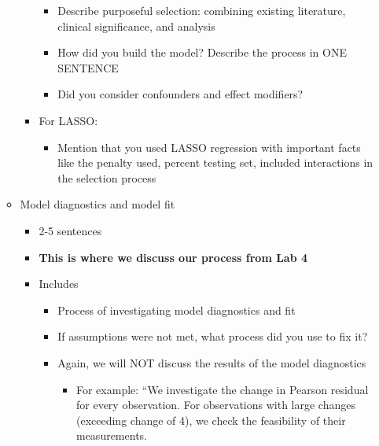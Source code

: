\documentclass[
  letterpaper,
  DIV=11,
  numbers=noendperiod]{scrartcl}
\providecommand{\tightlist}{%
  \setlength{\itemsep}{0pt}\setlength{\parskip}{0pt}}\usepackage{longtable,booktabs,array}
\begin{document}
\begin{itemize}
\begin{itemize}
\begin{itemize}
      \begin{itemize}
      \tightlist
      \item
        Describe purposeful selection: combining existing literature,
        clinical significance, and analysis
      \item
        How did you build the model? Describe the process in ONE
        SENTENCE
      \item
        Did you consider confounders and effect modifiers?
      \end{itemize}
    \item
      For LASSO:

      \begin{itemize}
      \tightlist
      \item
        Mention that you used LASSO regression with important facts like
        the penalty used, percent testing set, included interactions in
        the selection process
      \end{itemize}
    \end{itemize}
  \item
    Model diagnostics and model fit

    \begin{itemize}
    \tightlist
    \item
      2-5 sentences
    \item
      {\textbf{This is where we discuss our process from Lab 4}}
    \item
      Includes

      \begin{itemize}
      \tightlist
      \item
        Process of investigating model diagnostics and fit
      \item
        If assumptions were not met, what process did you use to fix it?
      \item
        Again, we will NOT discuss the results of the model diagnostics

        \begin{itemize}
        \tightlist
        \item
          For example: ``We investigate the change in Pearson residual
          for every observation. For observations with large changes
          (exceeding change of 4), we check the feasibility of their
          measurements.
        \end{itemize}
      \end{itemize}
    \end{itemize}
  \end{itemize}
\end{itemize}
\end{document}
